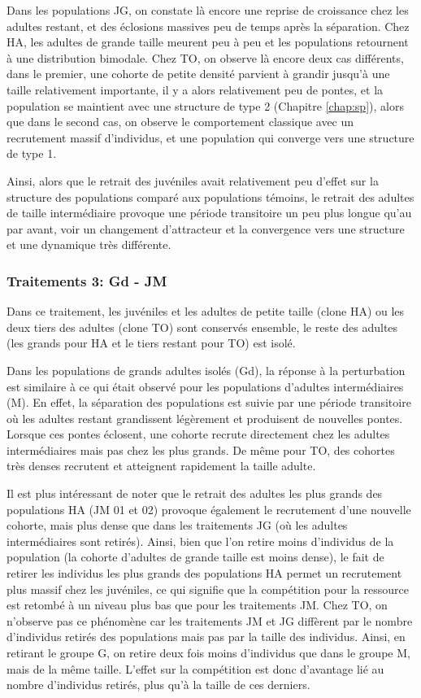 Dans les populations JG, on constate là encore une reprise de croissance chez
les adultes restant, et des éclosions massives peu de temps après la séparation.
Chez HA, les adultes de grande taille meurent peu à peu et les populations
retournent à une distribution bimodale. Chez TO, on observe là encore deux cas
différents, dans le premier, une cohorte de petite densité parvient à grandir
jusqu'à une taille relativement importante, il y a alors relativement peu de
pontes, et la population se maintient avec une structure de type 2 (Chapitre
\ref{chap:sp}), alors que dans le second cas, on observe le comportement
classique avec un recrutement massif d'individus, et une population qui converge
vers une structure de type 1.

Ainsi, alors que le retrait des juvéniles avait relativement peu d'effet sur la
structure des populations comparé aux populations témoins, le retrait des
adultes de taille intermédiaire provoque une période transitoire un peu plus
longue qu'au par avant, voir un changement d'attracteur et la convergence vers
une structure et une dynamique très différente. 

\subsubsection{Traitements 3: Gd - JM}

Dans ce traitement, les juvéniles et les adultes de petite taille (clone HA) ou
les deux tiers des adultes (clone TO) sont conservés ensemble, le reste des
adultes (les grands pour HA et le tiers restant pour TO) est isolé. 

Dans les populations de grands adultes isolés (Gd), la réponse à la perturbation
est similaire à ce qui était observé pour les populations d'adultes
intermédiaires (M). En effet, la séparation des populations est suivie par une
période transitoire où les adultes restant grandissent légèrement et produisent
de nouvelles pontes. Lorsque ces pontes éclosent, une cohorte recrute
directement chez les adultes intermédiaires mais pas chez les plus grands. De
même pour TO, des cohortes très denses recrutent et atteignent rapidement la
taille adulte. 

Il est plus intéressant de noter que le retrait des adultes les plus grands des
populations HA  (JM 01 et 02) provoque également le recrutement d'une nouvelle
cohorte, mais plus dense que dans les traitements JG (où les adultes
intermédiaires sont retirés). Ainsi, bien que l'on retire moins d'individus
de la population (la cohorte d'adultes de grande taille est moins dense), le
fait de retirer les individus les plus grands des populations HA permet un
recrutement plus massif chez les juvéniles, ce qui signifie que la compétition
pour la ressource est retombé à un niveau plus bas que pour les traitements JM.
Chez TO, on n'observe pas ce phénomène car les traitements JM et JG diffèrent
par le nombre d'individus retirés des populations mais pas par la taille des
individus. Ainsi, en retirant le groupe G, on retire deux fois moins d'individus
que dans le groupe M, mais de la même taille. L'effet sur la compétition est
donc d'avantage lié au nombre d'individus retirés, plus qu'à la taille de ces
derniers. 

